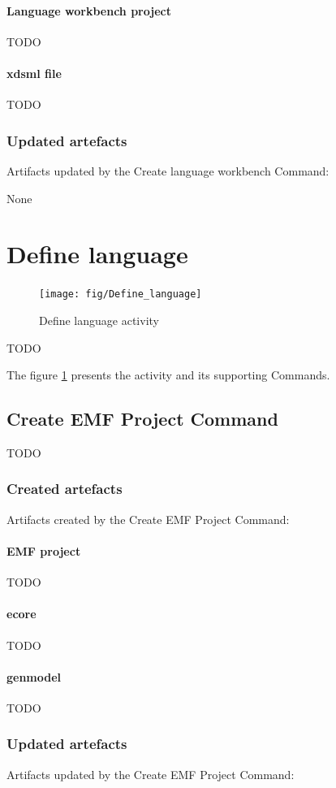 \documentclass{gemoc} %
\begin{document}
\paragraph{Language workbench project} 
TODO\paragraph{xdsml file} 
TODO
\subsubsection{Updated artefacts}
Artifacts updated by the Create language workbench Command:

	None

\section{Define language}
\label{sec:Define_language}
\begin{figure}[h!]
		\center
		\texttt{[image: fig/Define\_language]}
		\caption{Define language activity}
		\label{fig:Define_language}
\end{figure}

TODO

The figure \ref{fig:Define_language} presents the activity and its supporting Commands.

\subsection{Create EMF Project Command}
TODO
\subsubsection{Created artefacts}
Artifacts created by the Create EMF Project Command:
\paragraph{EMF project} 
TODO\paragraph{ecore} 
TODO\paragraph{genmodel} 
TODO
\subsubsection{Updated artefacts}
Artifacts updated by the Create EMF Project Command:
\end{document}
